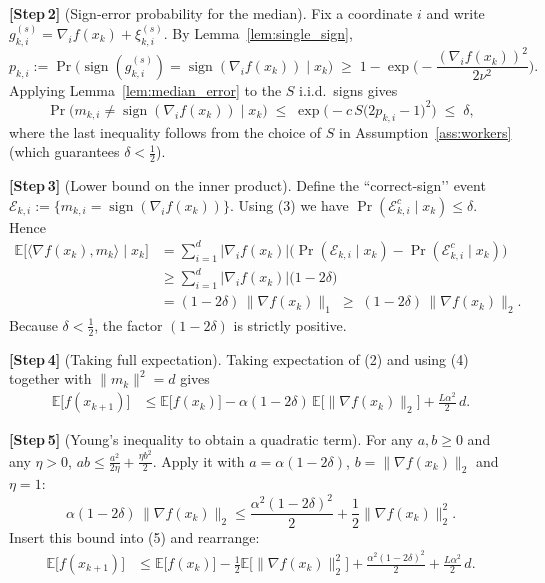 \documentclass[11pt]{article}
\newcommand{\E}{\mathbb{E}}
\newcommand{\sign}{\operatorname{sign}}
\begin{document}
\noindent\textbf{[Step 2]} (Sign‑error probability for the median).  
Fix a coordinate $i$ and write $g^{(s)}_{k,i}= \nabla_{i}f(x_{k})+\xi^{(s)}_{k,i}$.
By Lemma~\ref{lem:single_sign},
\[
    p_{k,i}:=\Pr\big(\sign(g^{(s)}_{k,i})=\sign(\nabla_{i}f(x_{k}))\mid x_{k}\big)
    \;\ge\; 1-\exp\!\Big(-\frac{(\nabla_{i}f(x_{k}))^{2}}{2\nu^{2}}\Big).
\]
Applying Lemma~\ref{lem:median_error} to the $S$ i.i.d.\ signs gives
\[
    \Pr\big(m_{k,i}\neq\sign(\nabla_{i}f(x_{k}))\mid x_{k}\big)
    \;\le\;
    \exp\!\Big(-c\,S\big(2p_{k,i}-1\big)^{2}\Big)
    \;\le\;
    \delta,
\tag{3}
\]
where the last inequality follows from the choice of $S$ in Assumption~\ref{ass:workers}
(which guarantees $\delta<\tfrac12$).

\noindent\textbf{[Step 3]} (Lower bound on the inner product).  
Define the “correct‑sign’’ event $\mathcal{E}_{k,i}:=\{m_{k,i}= \sign(\nabla_{i}f(x_{k}))\}$.
Using (3) we have $\Pr(\mathcal{E}_{k,i}^{c}\mid x_{k})\le\delta$.
Hence
\[
\begin{aligned}
    \E\!\big[\langle\nabla f(x_{k}),m_{k}\rangle\mid x_{k}\big]
    &=\sum_{i=1}^{d}|\nabla_{i}f(x_{k})|
      \big(\Pr(\mathcal{E}_{k,i}\mid x_{k})-\Pr(\mathcal{E}_{k,i}^{c}\mid x_{k})\big)\\
    &\ge\sum_{i=1}^{d}|\nabla_{i}f(x_{k})|\big(1-2\delta\big)\\
    &=(1-2\delta)\,\|\nabla f(x_{k})\|_{1}
    \;\ge\;(1-2\delta)\,\|\nabla f(x_{k})\|_{2}.
\end{aligned}
\tag{4}
\]
Because $\delta<\tfrac12$, the factor $(1-2\delta)$ is strictly positive.

\noindent\textbf{[Step 4]} (Taking full expectation).  
Taking expectation of (2) and using (4) together with $\|m_{k}\|^{2}=d$ gives
\[
\begin{aligned}
    \E\!\big[f(x_{k+1})\big]
    &\le \E\!\big[f(x_{k})\big]
        -\alpha(1-2\delta)\,\E\!\big[\|\nabla f(x_{k})\|_{2}\big]
        +\frac{L\alpha^{2}}{2}\,d .
\end{aligned}
\tag{5}
\]

\noindent\textbf{[Step 5]} (Young’s inequality to obtain a quadratic term).  
For any $a,b\ge0$ and any $\eta>0$, $ab\le \frac{a^{2}}{2\eta}+\frac{\eta b^{2}}{2}$.
Apply it with $a=\alpha(1-2\delta)$, $b=\|\nabla f(x_{k})\|_{2}$ and $\eta=1$:
\[
    \alpha(1-2\delta)\,\|\nabla f(x_{k})\|_{2}
    \le \frac{\alpha^{2}(1-2\delta)^{2}}{2}
        +\frac{1}{2}\|\nabla f(x_{k})\|_{2}^{2}.
\]
Insert this bound into (5) and rearrange:
\[
\begin{aligned}
    \E\!\big[f(x_{k+1})\big]
    &\le \E\!\big[f(x_{k})\big]
        -\frac{1}{2}\E\!\big[\|\nabla f(x_{k})\|_{2}^{2}\big]
        +\frac{\alpha^{2}(1-2\delta)^{2}}{2}
        +\frac{L\alpha^{2}}{2}\,d .
\end{aligned}
\tag{6}
\]
\end{document}

